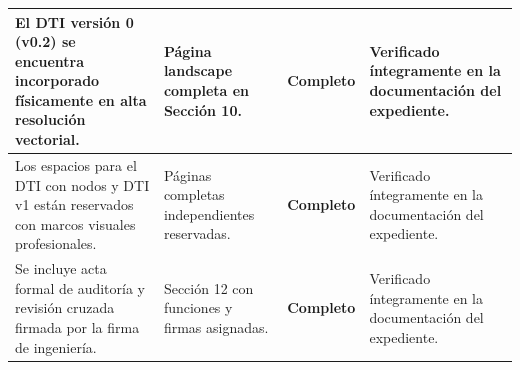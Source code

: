 \documentclass[10pt,letterpaper]{article}
\begin{document}
\begin{xltabular}{\textwidth}{|p{4.8cm}|p{2.6cm}|c|>{\raggedright\arraybackslash}X|}
El DTI versión 0 (v0.2) se encuentra incorporado físicamente en alta resolución vectorial. & Página landscape completa en Sección 10. & \textbf{Completo} & Verificado íntegramente en la documentación del expediente. \\ \hline
Los espacios para el DTI con nodos y DTI v1 están reservados con marcos visuales profesionales. & Páginas completas independientes reservadas. & \textbf{Completo} & Verificado íntegramente en la documentación del expediente. \\ \hline
Se incluye acta formal de auditoría y revisión cruzada firmada por la firma de ingeniería. & Sección 12 con funciones y firmas asignadas. & \textbf{Completo} & Verificado íntegramente en la documentación del expediente. \\ \hline
\end{xltabular}
\end{document}

